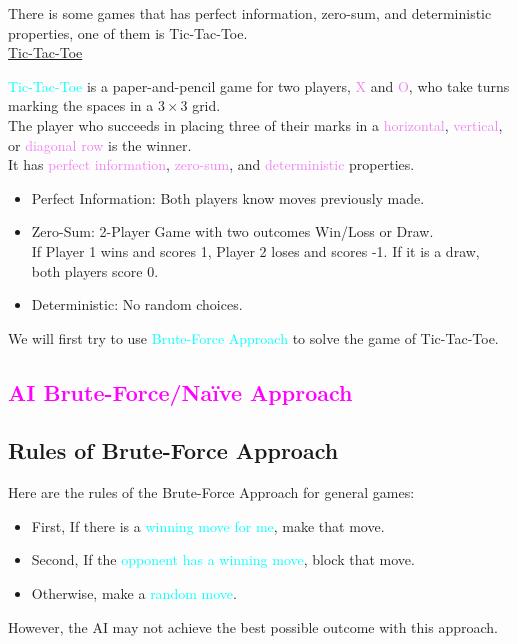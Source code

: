 \documentclass{book}
\begin{document}
There is some games that has perfect information, zero-sum, and deterministic properties, one of them is Tic-Tac-Toe.\\
\vspace{2mm}
\uline{\large Tic-Tac-Toe}\\
\vspace{1mm}
\begin{figure}
    \centering
\end{figure}
\textcolor{cyan}{Tic-Tac-Toe} is a paper-and-pencil game for two players, \textcolor{violet}{X} and \textcolor{violet}{O}, who take turns marking the spaces in a $3 \times 3$ grid.\\
The player who succeeds in placing three of their marks in a \textcolor{violet}{horizontal}, \textcolor{violet}{vertical}, or \textcolor{violet}{diagonal row} is the winner.\\
It has \textcolor{violet}{perfect information}, \textcolor{violet}{zero-sum}, and \textcolor{violet}{deterministic} properties.\\
\begin{itemize}
    \item Perfect Information: Both players know moves previously made.
    \item Zero-Sum: 2-Player Game with two outcomes Win/Loss or Draw.
    \\
    If Player 1 wins and scores 1, Player 2 loses and scores -1. If it is a draw, both players score 0.
    \item Deterministic: No random choices.
\end{itemize}
We will first try to use \textcolor{cyan}{Brute-Force Approach} to solve the game of Tic-Tac-Toe.\\
\textcolor{magenta}{\section{\textbf{AI Brute-Force/Naïve Approach}}}
\subsection{Rules of Brute-Force Approach}
Here are the rules of the Brute-Force Approach for general games:
\begin{itemize}
    \item First, If there is a \textcolor{cyan}{winning move for me}, make that move.
    \item Second, If the \textcolor{cyan}{opponent has a winning move}, block that move.
    \item Otherwise, make a \textcolor{cyan}{random move}.
\end{itemize}
However, the AI may not achieve the best possible outcome with this approach.\\
\newpage
\end{document}

